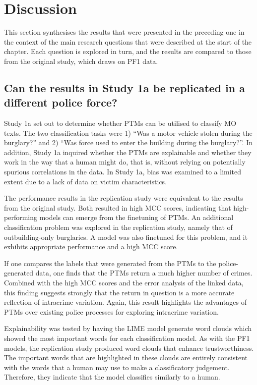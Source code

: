 \section{Discussion} This section synthesises the results that were presented in the preceding one in the context of the main research questions that were described at the start of the chapter. Each question is explored in turn, and the results are compared to those from the original study, which draws on PF1 data.

\subsection{Can the results in Study 1a be replicated in a different police force?}Study 1a set out to determine whether PTMs can be utilised to classify MO texts. The two classification tasks were 1) “Was a motor vehicle stolen during the burglary?” and 2) “Was force used to enter the building during the burglary?”. In addition, Study 1a inquired whether the PTMs are explainable and whether they work in the way that a human might do, that is, without relying on potentially spurious correlations in the data. In Study 1a, bias was examined to a limited extent due to a lack of data on victim characteristics.

The performance results in the replication study were equivalent to the results from the original study. Both resulted in high MCC scores, indicating that high-performing models can emerge from the finetuning of PTMs. An additional classification problem was explored in the replication study, namely that of outbuilding-only burglaries. A model was also finetuned for this problem, and it exhibits appropriate performance and a high MCC score.

If one compares the labels that were generated from the PTMs to the police-generated data, one finds that the PTMs return a much higher number of crimes. Combined with the high MCC scores and the error analysis of the linked data, this finding suggests strongly that the return in question is a more accurate reflection of intracrime variation. Again, this result highlights the advantages of PTMs over existing police processes for exploring intracrime variation.

Explainability was tested by having the LIME model generate word clouds which showed the most important words for each classification model. As with the PF1 models, the replication study produced word clouds that enhance trustworthiness. The important words that are highlighted in these clouds are entirely consistent with the words that a human may use to make a classificatory judgement. Therefore, they indicate that the model classifies similarly to a human.

